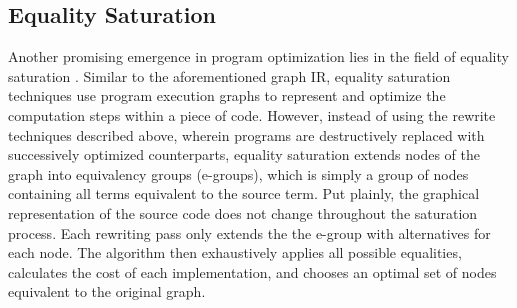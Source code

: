 \documentclass{article}
\begin{document}
\subsection{Equality Saturation}
Another promising emergence in program optimization lies in the field of equality saturation \cite{tate2009equality,nandi2021RewriteEqSat}. Similar to the aforementioned graph IR, equality saturation techniques use program execution graphs to represent and optimize the computation steps within a piece of code. However, instead of using the rewrite techniques described above, wherein programs are destructively replaced with successively optimized counterparts, equality saturation extends nodes of the graph into equivalency groups (e-groups), which is simply a group of nodes containing all terms equivalent to the source term. Put plainly, the graphical representation of the source code does not change throughout the saturation process. Each rewriting pass only extends the the e-group with alternatives for each node. The algorithm then exhaustively applies all possible equalities, calculates the cost of each implementation, and chooses an optimal set of nodes equivalent to the original graph.
\end{document}

